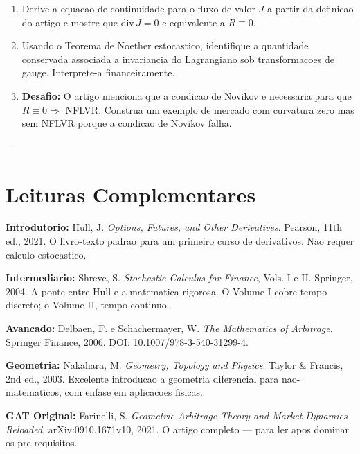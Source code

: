 \documentclass[12pt,a4paper]{article}
\theoremstyle{remark}
\begin{document}
\begin{enumerate}[nosep]
  \item Derive a equacao de continuidade para o fluxo de valor $J$ a partir da
        definicao do artigo e mostre que $\text{div}\,J = 0$ e equivalente a
        $R \equiv 0$.
  \item Usando o Teorema de Noether estocastico, identifique a quantidade
        conservada associada a invariancia do Lagrangiano sob transformacoes
        de gauge. Interprete-a financeiramente.
  \item \textbf{Desafio:} O artigo menciona que a condicao de Novikov e
        necessaria para que $R \equiv 0 \Rightarrow$ NFLVR. Construa um exemplo
        de mercado com curvatura zero mas sem NFLVR porque a condicao de Novikov
        falha.
\end{enumerate}

---

\section*{Leituras Complementares}

\begin{enumerate}[label={[\arabic*]},nosep]
  \item \textbf{Introdutorio:} Hull, J. \textit{Options, Futures, and Other
        Derivatives}. Pearson, 11th ed., 2021. O livro-texto padrao para um
        primeiro curso de derivativos. Nao requer calculo estocastico.
  \item \textbf{Intermediario:} Shreve, S. \textit{Stochastic Calculus for
        Finance}, Vols. I e II. Springer, 2004. A ponte entre Hull e a
        matematica rigorosa. O Volume I cobre tempo discreto; o Volume II,
        tempo continuo.
  \item \textbf{Avancado:} Delbaen, F. e Schachermayer, W. \textit{The
        Mathematics of Arbitrage}. Springer Finance, 2006. DOI:
        10.1007/978-3-540-31299-4.
  \item \textbf{Geometria:} Nakahara, M. \textit{Geometry, Topology and Physics}.
        Taylor \& Francis, 2nd ed., 2003. Excelente introducao a geometria
        diferencial para nao-matematicos, com enfase em aplicacoes fisicas.
  \item \textbf{GAT Original:} Farinelli, S. \textit{Geometric Arbitrage Theory
        and Market Dynamics Reloaded}. arXiv:0910.1671v10, 2021. O artigo
        completo — para ler apos dominar os pre-requisitos.
\end{enumerate}
\end{document}
